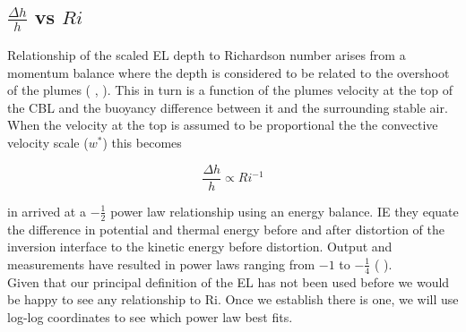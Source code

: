 \subsection{$\frac{\Delta h}{h}$ vs $Ri$}

Relationship of the scaled \acs{EL} depth to Richardson number arises from a momentum balance where the depth is considered to be related to the overshoot of the plumes (\citeauthor{Stull73} \cite{Stull73}, \citeauthor{DearWill80} \cite{DearWill80}).  This in turn is a function of the plumes velocity at the top of the \acs{CBL} and the buoyancy difference between it and the surrounding stable air.  When the velocity at the top is assumed to be proportional the the convective velocity scale ($w^{*}$) this becomes

\begin{equation}
\frac{\Delta h}{h} \propto Ri^{-1}
\end{equation}

 in \cite{Boers89} arrived at a $-\frac{1}{2}$ power law relationship using an energy balance.  IE they equate the difference in potential and thermal energy before and after distortion of the inversion interface to the kinetic energy before distortion. Output and measurements have resulted in power laws ranging from  $-1$ to $-\frac{1}{4}$ (\citeauthor{Traum11} \cite{Traum11}).\\

Given that our principal definition of the \acs{EL} has not been used before we would be happy to see any relationship to \acs{Ri}.  Once we establish there is one, we will use log-log coordinates to see which power law best fits.\\


\endinput

Any text after an \endinput is ignored.
You could put scraps here or things in progress.


